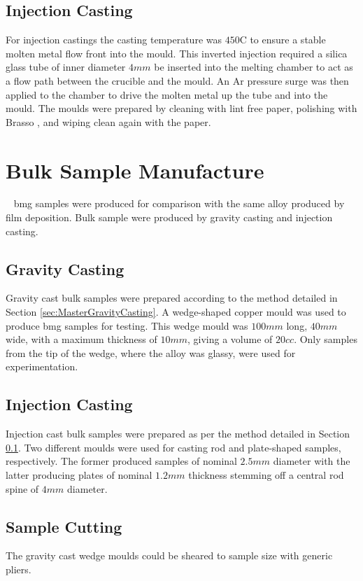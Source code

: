 \subsection{Injection Casting} \label{sec:MasterInjectionCasting}

For injection castings the casting temperature was $450$\degree C to ensure a stable molten metal flow front into the mould. This inverted injection required a silica glass tube of inner diameter $4mm$ be inserted into the melting chamber to act as a flow path between the crucible and the mould. An Ar pressure surge was then applied to the chamber to drive the molten metal up the tube and into the mould. The moulds were prepared by cleaning with lint free paper, polishing with Brasso \textcopyright, and wiping clean again with the paper. 

\section{Bulk Sample Manufacture}
\MgZnCa~ \gls{bmg} samples were produced for comparison with the same alloy produced by film deposition. Bulk sample were produced by gravity casting and injection casting. 

\subsection{Gravity Casting}
Gravity cast bulk samples were prepared according to the method detailed in Section \ref{sec:MasterGravityCasting}. A wedge-shaped copper mould was used to produce \gls{bmg} samples for testing. This wedge mould was $100mm$ long, $40mm$ wide, with a maximum thickness of $10mm$, giving a volume of $20cc$. Only samples from the tip of the wedge, where the alloy was glassy, were used for experimentation. 

\subsection{Injection Casting}
Injection cast bulk samples were prepared as per the method detailed in Section \ref{sec:MasterInjectionCasting}. Two different moulds were used for casting rod and plate-shaped samples, respectively. The former produced samples of nominal $2.5 mm$ diameter with the latter producing plates of nominal $1.2 mm$ thickness stemming off a central rod spine of $4 mm$ diameter.  

\subsection{Sample Cutting}
The gravity cast wedge moulds could be sheared to sample size with generic pliers. 

